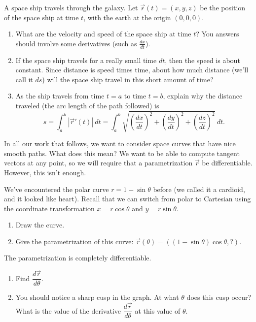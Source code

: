 \begin{problem}
A space ship travels through the galaxy. Let $\vec r(t) = (x,y,z)$ 
%
be the position of the space ship at time $t$, with the earth at the origin $(0,0,0)$. 
\begin{enumerate}
 \item What are the velocity and speed of the space ship at time $t$? You answers should involve some derivatives (such as $\frac{dx}{dt}$).
 \item If the space ship travels for a really small time $dt$, then the speed is about constant. Since distance is speed times time, about how much distance (we'll call it $ds$) will the space ship travel in this short amount of time?
 \item As the ship travels from time $t=a$ to time $t=b$, explain why the distance traveled (the arc length of the path followed) is $$s=\int_a^b |\vec r '(t)|\ dt = \int_a^b \sqrt{\left(\frac{dx}{dt}\right)^2+\left(\frac{dy}{dt}\right)^2+\left(\frac{dz}{dt}\right)^2}\ dt .$$ \label{arc length2}
\end{enumerate}

\end{problem}

In all our work that follows, we want to consider space curves that have nice smooth paths.  What does this mean?  We want to be able to compute tangent vectors at any point, so we will require that a parametrization $\vec r$ be differentiable.  However, this isn't enough.  
\begin{problem}
 We've encountered the polar curve $r = 1-\sin\theta$ before (we called it a cardioid, and it looked like heart).  Recall that we can switch from polar to Cartesian using the coordinate transformation $x=r\cos\theta$ and $y=r\sin\theta$. 
\begin{enumerate}
 \item Draw the curve.
 \item Give the parametrization of this curve: $\vec r(\theta) = ((1-\sin\theta)\cos\theta, ?)$.  
\end{enumerate}
The parametrization is completely differentiable.  
\begin{enumerate}[resume]
	\item Find $\dfrac{d\vec r}{d\theta}$.
	\item You should notice a sharp cusp in the graph. At what $\theta$ does this cusp occur?  What is the value of the derivative $\dfrac{d\vec r}{d\theta}$ at this value of $\theta$. 
\end{enumerate}
\end{problem}

